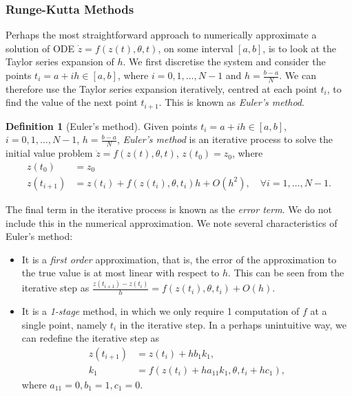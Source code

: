 \documentclass[a4paper,11pt,titlepage]{article}
\theoremstyle{definition}
\newtheorem{definition}{Definition}[section]
\theoremstyle{plain}
\theoremstyle{remark}
\begin{document}
\subsubsection{Runge-Kutta Methods}
\label{sec:rungekutta}

Perhaps the most straightforward approach to numerically approximate a solution of ODE $\dot{z}= f(z(t), \theta,t)$, on some interval $\left[a, b\right]$, is to look at the Taylor series expansion of $h$. We first discretise the system and consider the points $t_i = a + ih \in \left[a, b\right]$, where $i = 0, 1, \dots, N - 1$ and $h = \frac{b-a}{N}$. We can therefore use the Taylor series expansion iteratively, centred at each point $t_i$, to find the value of the next point $t_{i + 1}$. This is known as \textit{Euler's method}.

\begin{definition}[Euler's method]
    Given points $t_i = a + ih \in \left[a, b\right]$, $i = 0, 1, \dots, N - 1$, $h = \frac{b-a}{N}$, \textit{Euler's method} is an iterative process to solve the initial value problem $\dot{z}= f(z(t), \theta,t)$, $z(t_0) = z_0$, where
    \begin{align*}
        z(t_0) &= z_0 \\
        z(t_{i+1}) &= z(t_i) + f(z(t_{i}), \theta, t_i)h + O(h^2),\quad\forall i = 1, \dots, N - 1.
    \end{align*}
\end{definition}

The final term in the iterative process is known as the \textit{error term}. We do not include this in the numerical approximation. We note several characteristics of Euler's method:
\begin{itemize}
    \item It is a \textit{first order} approximation, that is, the error of the approximation to the true value is at most linear with respect to $h$. This can be seen from the iterative step as $\frac{z(t_{i+1}) - z(t_i)}{h} = f(z(t_i),\theta,t_i) + O(h)$.
    \item It is a \textit{1-stage} method, in which we only require 1 computation of $f$ at a single point, namely $t_i$ in the iterative step. In a perhaps unintuitive way, we can redefine the iterative step as 
    \begin{align*}
        z(t_{i+1}) &= z(t_i) + h b_1 k_1, \\
        k_1 &= f\left(z(t_i) + h a_{11}k_1, \theta, t_i + hc_1\right),
    \end{align*}
    where $a_{11} = 0, b_1 = 1, c_1 = 0$.
\end{itemize}
\end{document}

